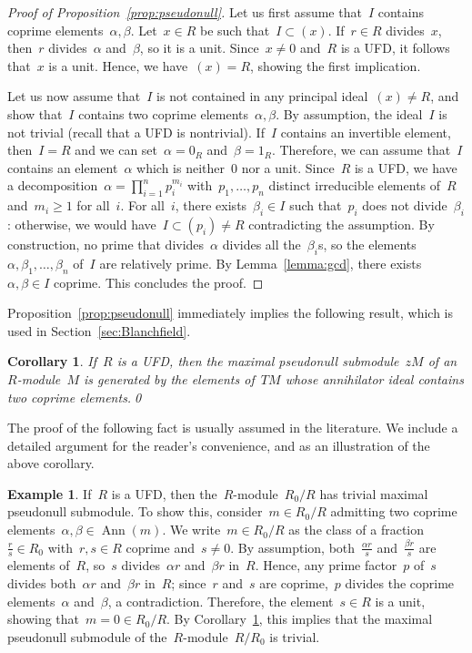 \documentclass[10.9pt,a4paper]{amsart}
\newtheorem{corollary}[theorem]{Corollary}
\theoremstyle{definition}
\newtheorem{example}[theorem]{Example}
\theoremstyle{remark}
\newcommand{\Ann}{\operatorname{Ann}}
\begin{document}
\begin{proof}[Proof of Proposition~\ref{prop:pseudonull}]
Let us first assume that~$I$ contains coprime elements~$\alpha,\beta$. Let~$x\in R$ be such that~$I\subset (x)$. If~$r\in R$ divides~$x$, then~$r$ divides~$\alpha$ and~$\beta$, so it is a unit.
Since~$x\neq 0$ and~$R$ is a UFD, it follows that~$x$ is a unit. Hence, we have~$(x)=R$, showing the first implication.

Let us now assume that~$I$ is not contained in any principal ideal~$(x)\neq R$, and show that~$I$
contains two coprime elements~$\alpha,\beta$. By assumption, the ideal~$I$ is not trivial (recall that a UFD is nontrivial). If~$I$ contains an invertible element, then~$I=R$ and we can set~$\alpha=0_R$ and~$\beta=1_R$. Therefore, we can assume that~$I$ contains an element~$\alpha$ which is neither~$0$ nor a unit.
Since~$R$ is a UFD, we have a decomposition~$\alpha=\prod_{i=1}^n p_i^{m_i}$ with~$p_1,\dots,p_n$ distinct irreducible
elements of~$R$ and~$m_i\ge 1$ for all~$i$. For all~$i$, there exists~$\beta_i\in I$ such that~$p_i$ does not divide~$\beta_i$: otherwise, we would have~$I\subset (p_i)\neq R$ contradicting the assumption.
By construction, no prime that divides~$\alpha$ divides all the~$\beta_i$s, so the elements~$\alpha,\beta_1,\dots,\beta_n$ of~$I$ are relatively prime. By Lemma~\ref{lemma:gcd},
there exists~$\alpha,\beta\in I$ coprime. This concludes the proof.
\end{proof}


Proposition~\ref{prop:pseudonull} immediately implies the following result, which is used in Section~\ref{sec:Blanchfield}.

\begin{corollary}
\label{cor:max-pn}
If~$R$ is a UFD, then the maximal pseudonull submodule~$zM$ of an~$R$-module~$M$ is generated by the
elements of~$TM$ whose annihilator ideal contains two coprime elements.\qed
\end{corollary}

The proof of the following fact is usually assumed in the literature. We include a detailed argument
for the reader's convenience, and as an illustration of the above corollary.

\begin{example}
\label{ex:NoPN}
If~$R$ is a UFD, then the~$R$-module~$R_0/R$ has trivial maximal pseudonull submodule.
To show this, consider~$m\in R_0/R$ admitting two coprime elements~$\alpha,\beta\in\Ann(m)$. We write~$m\in R_0/R$ as the class of a fraction~$\frac{r}{s}\in R_0$ with~$r,s \in R$ coprime and~$s\neq 0$. By assumption, both~$\frac{\alpha r}{s}$ and~$\frac{\beta r}{s}$ are elements of~$R$, so~$s$ divides~$\alpha r$ and~$\beta r$ in~$R$.
Hence, any prime factor~$p$ of~$s$ divides both~$\alpha r$ and~$\beta r$ in~$R$; since~$r$ and~$s$ are coprime,~$p$ divides the coprime elements~$\alpha$ and~$\beta$, a contradiction.
Therefore, the element~$s\in R$ is a unit, showing that~$m=0\in R_0/R$.
By Corollary~\ref{cor:max-pn}, this implies that the maximal pseudonull submodule of the~$R$-module~$R/R_0$ is trivial.
\end{example}
\end{document}
